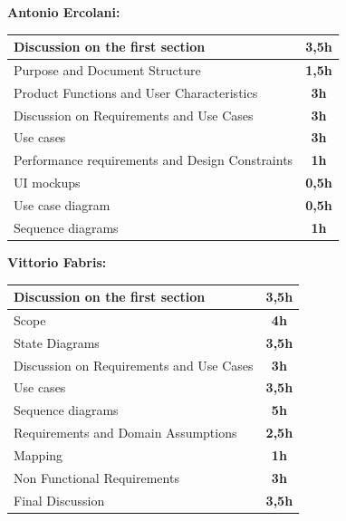 \documentclass[]{article}
\begin{document}
	\medskip
	\textbf{\large Antonio Ercolani:} \\ \newline
	\begin{tabular}{|l|c|}
		\hline
		Discussion on the first section &  \textbf{3,5h} \\ \hline
		\rowcolor[HTML]{DCDCDC} 
		Purpose and Document Structure & \textbf{1,5h} \\ \hline
		Product Functions and User Characteristics & \textbf{3h} \\ \hline
		\rowcolor[HTML]{DCDCDC}
		Discussion on Requirements and Use Cases & \textbf{3h} \\ \hline
		Use cases & \textbf{3h} \\ \hline
		\rowcolor[HTML]{DCDCDC}
		Performance requirements and Design Constraints & \textbf{1h} \\ \hline
		UI mockups & \textbf{0,5h} \\ \hline
		\rowcolor[HTML]{DCDCDC}
		Use case diagram & \textbf{0,5h} \\ \hline
		Sequence diagrams & \textbf{1h} \\ \hline
	\end{tabular}
	
	
	\textbf{} \newline
	\textbf{} \newline

	\textbf{\large Vittorio Fabris:} \\ \newline
		\begin{tabular}{|l|c|}
			\hline
			Discussion on the first section &  \textbf{3,5h} \\ \hline
			\rowcolor[HTML]{DCDCDC} 
			Scope & \textbf{4h} \\ \hline
			State Diagrams & \textbf{3,5h} \\ \hline
			\rowcolor[HTML]{DCDCDC} 
			Discussion on Requirements and Use Cases & \textbf{3h} \\ \hline
			Use cases & \textbf{3,5h} \\ \hline
			\rowcolor[HTML]{DCDCDC}
			Sequence diagrams & \textbf{5h} \\ \hline
			Requirements and Domain Assumptions  & \textbf{2,5h} \\ \hline
			\rowcolor[HTML]{DCDCDC}
			Mapping & \textbf{1h} \\ \hline
			Non Functional Requirements & \textbf{3h} \\ \hline
			\rowcolor[HTML]{DCDCDC}
			Final Discussion & \textbf{3,5h} \\ \hline
		\end{tabular}
		
\end{document}
